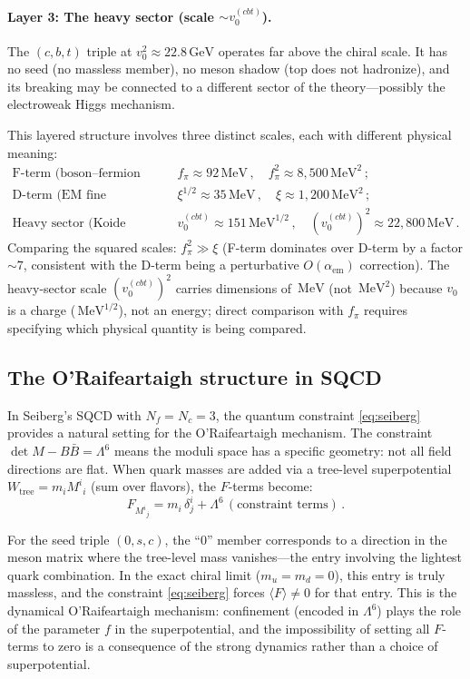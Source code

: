 \documentclass[12pt,a4paper]{article}
\newcommand{\MeV}{\,\text{MeV}}
\newcommand{\GeV}{\,\text{GeV}}
\begin{document}
\paragraph{Layer 3: The heavy sector (scale $\sim v_0^{(cbt)}$).}
The $(c,b,t)$ triple at $v_0^2 \approx 22.8\GeV$ operates far 
above the chiral scale. It has no seed (no massless member), no 
meson shadow (top does not hadronize), and its breaking may be 
connected to a different sector of the theory---possibly the 
electroweak Higgs mechanism.

This layered structure involves three distinct scales, each with 
different physical meaning:
\begin{align}
\text{F-term (boson--fermion splitting):} &\quad 
f_\pi \approx 92\MeV\,, \quad f_\pi^2 \approx 8{,}500\MeV^2\,; \\
\text{D-term (EM fine structure):} &\quad 
\xi^{1/2} \approx 35\MeV\,, \quad \xi \approx 1{,}200\MeV^2\,; \\
\text{Heavy sector (Koide scale):} &\quad 
v_0^{(cbt)} \approx 151\MeV^{1/2}\,, \quad (v_0^{(cbt)})^2 \approx 22{,}800\MeV\,.
\end{align}
Comparing the squared scales: $f_\pi^2 \gg \xi$ (F-term dominates 
over D-term by a factor $\sim 7$, consistent with the D-term being 
a perturbative $O(\alpha_{\text{em}})$ correction). The heavy-sector 
scale $(v_0^{(cbt)})^2$ carries dimensions of $\MeV$ (not $\MeV^2$) 
because $v_0$ is a charge ($\MeV^{1/2}$), not an energy; direct 
comparison with $f_\pi$ requires specifying which physical quantity 
is being compared.

\subsection{The O'Raifeartaigh structure in SQCD}

In Seiberg's SQCD with $N_f = N_c = 3$, the quantum constraint 
\eqref{eq:seiberg} provides a natural setting for the 
O'Raifeartaigh mechanism. The constraint $\det M - B\bar{B} = \Lambda^6$ 
means the moduli space has a specific geometry: not all field directions 
are flat. When quark masses are added via a tree-level superpotential 
$W_{\text{tree}} = m_i M^i{}_i$ (sum over flavors), the $F$-terms become:
\begin{equation}
F_{M^i{}_j} = m_i\,\delta^i_j + \Lambda^6\,(\text{constraint terms})\,.
\end{equation}

For the seed triple $(0, s, c)$, the ``$0$'' member corresponds to a 
direction in the meson matrix where the tree-level mass vanishes---the 
entry involving the lightest quark combination. In the exact chiral 
limit ($m_u = m_d = 0$), this entry is truly massless, and the 
constraint \eqref{eq:seiberg} forces $\langle F\rangle \neq 0$ for 
that entry. This is the dynamical O'Raifeartaigh mechanism: 
confinement (encoded in $\Lambda^6$) plays the role of the parameter 
$f$ in the superpotential, and the impossibility of setting all 
$F$-terms to zero is a consequence of the strong dynamics rather 
than a choice of superpotential.
\end{document}
